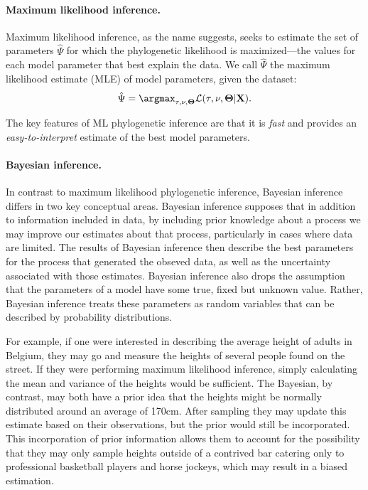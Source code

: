 \paragraph*{Maximum likelihood inference.}
Maximum likelihood inference, as the name suggests, seeks to estimate the set of parameters $\hat{\Psi}$ for which the phylogenetic likelihood is maximized---the values for each model parameter that best explain the data.
We call $\hat{\Psi}$ the maximum likelihood estimate (MLE) of model parameters, given the dataset:
\begin{equation}
  \hat{\Psi} = \argmax_{\tau,\mathbf{\nu},\mathbf{\Theta}} \mathcal{L}(\tau, \mathbf{\nu},\mathbf{\Theta} | \mathbf{X}).
\end{equation}

The key features of ML phylogenetic inference are that it is \textit{fast} and provides an \textit{easy-to-interpret} estimate of the best model parameters.

\paragraph*{Bayesian inference.}
In contrast to maximum likelihood phylogenetic inference, Bayesian inference differs in two key conceptual areas.
Bayesian inference supposes that in addition to information included in data, by including prior knowledge about a process we may improve our estimates about that process, particularly in cases where data are limited.
The results of Bayesian inference then describe the best parameters for the process that generated the obseved data, as well as the uncertainty associated with those estimates.
Bayesian inference also drops the assumption that the parameters of a model have some true, fixed but unknown value.
Rather, Bayesian inference treats these parameters as random variables that can be described by probability distributions.

For example, if one were interested in describing the average height of adults in Belgium, they may go and measure the heights of several people found on the street.
If they were performing maximum likelihood inference, simply calculating the mean and variance of the heights would be sufficient.
The Bayesian, by contrast, may both have a prior idea that the heights might be normally distributed around an average of 170cm.
After sampling they may update this estimate based on their observations, but the prior would still be incorporated.
This incorporation of prior information allows them to account for the possibility that they may only sample heights outside of a contrived bar catering only to professional basketball players and horse jockeys, which may result in a biased estimation.

